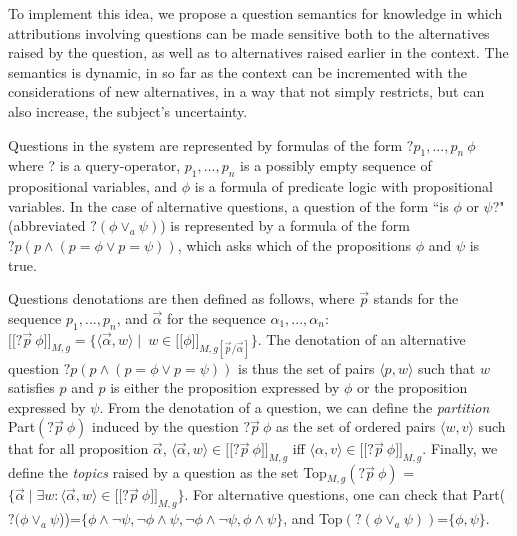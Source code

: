 \documentclass[times,10pt,twocolumn]{article}
\newcommand{\lin}{\ensuremath{\lbrack\!\lbrack}}
\newcommand{\rin}{\ensuremath{\rbrack\!\rbrack}}
\begin{document}

To implement this idea, we propose a question semantics for
knowledge in which attributions involving questions can be made
sensitive both to the alternatives raised by the question, as well
as to alternatives raised earlier in the context. The semantics is
dynamic, in so far as the context can be incremented with the
considerations of new alternatives, in a way that not simply
restricts, but can also increase, the subject's uncertainty.


Questions in the system are represented by formulas of the form $?
p_1, ..., p_n \ \phi$ where ? is a query-operator, $p_1, ..., p_n$
is a possibly empty sequence of propositional variables, and
$\phi$ is a formula of predicate logic with propositional
variables. In the case of alternative questions, a question of the
form ``is $\phi$ or $\psi$?" (abbreviated $?(\phi \vee_{a} \psi)$)
is represented by a formula of the form $?p ( p \wedge (p=\phi
\vee p=\psi))$, which asks which of the propositions $\phi$ and
$\psi$ is true.

Questions denotations are then defined as follows, where $\vec{p}$
stands for the sequence $p_1,...,p_n$, and  $\vec{\alpha}$ for
 the sequence $\alpha_1,...,\alpha_n$: $\lin? \vec{p} \ \phi\rin_{M,g} = \{ \langle
\vec{\alpha}, w\rangle \mid  \ w \in  \lin  \phi\rin_{M,g[\vec{p}
/ \vec{\alpha}  ]}  \}$. The denotation of an alternative question
$?p (p \wedge    (p=\phi \vee p=\psi))$ is thus the set of pairs
$\langle  p, w \rangle$ such that $w$ satisfies $p$ and  $p$ is
either the proposition expressed by $ \phi $ or the proposition
expressed by $  \psi $. From the denotation of a question, we can
define the \emph{partition} Part$(?\vec{p}  \ \phi)$ induced by
the question $?\vec{p}  \ \phi$ as the set of ordered pairs
$\langle w,v\rangle$ such that for all proposition $\vec{\alpha}$,
$\langle \vec{\alpha}, w\rangle \in \lin ? \vec{p} \ \phi
\rin_{M,g}$ iff $\langle \alpha, v\rangle \in \lin ? \vec{p} \
\phi \rin_{M,g}$. Finally, we define the \emph{topics} raised by a
question as the set Top$_{M,g}(?\vec{p} \ \phi)$ = $\{
\vec{\alpha}  \mid \exists w: \langle  \vec{\alpha} , w\rangle \in
\lin ?\vec{p}  \ \phi\rin_{M,g} \}$. For alternative questions,
one can check that Part($?(\phi \vee_{a} \psi$))=$\{\phi \wedge
\neg \psi, \neg \phi \wedge \psi, \neg \phi \wedge \neg \psi, \phi
\wedge \psi\}$, and Top$(?(\phi \vee_{a} \psi))$=$\{\phi, \psi\}$.
\end{document}
